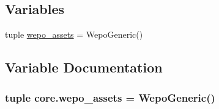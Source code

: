 \subsection*{Variables}
\begin{DoxyCompactItemize}
\item 
tuple \hyperlink{namespacecore_aa3a4d9b7cefbd434631d48e879351f8d}{wepo\-\_\-assets} = Wepo\-Generic()
\end{DoxyCompactItemize}


\subsection{Variable Documentation}
\hypertarget{namespacecore_aa3a4d9b7cefbd434631d48e879351f8d}{
\subsubsection[{wepo\-\_\-assets}]{\setlength{\rightskip}{0pt plus 5cm}tuple core.\-wepo\-\_\-assets = Wepo\-Generic()}}\label{namespacecore_aa3a4d9b7cefbd434631d48e879351f8d}

